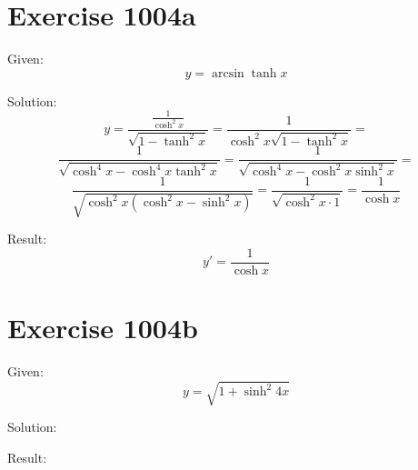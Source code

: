 \documentclass[a4paper, 10pt]{scrartcl}
\begin{document}
\section{Exercise 1004a}

Given:
\[
y = \arcsin{\tanh{x}}
\]

Solution:
\[
y = \frac{\frac{1}{\cosh^{2}{x}}}{\sqrt{1 - \tanh^{2}{x}}} = \frac{1}{\cosh^{2}{x}\sqrt{1 - \tanh^{2}{x}}} =
\]
\[
\frac{1}{\sqrt{\cosh^{4}{x} - \cosh^{4}{x}\tanh^{2}{x}}} = \frac{1}{\sqrt{\cosh^{4}{x} - \cosh^{2}{x}\sinh^{2}{x}}} =
\]
\[
\frac{1}{\sqrt{\cosh^{2}{x}(\cosh^{2}{x} - \sinh^{2}{x})}} = \frac{1}{\sqrt{\cosh^{2}{x}\cdot 1}} = \frac{1}{\cosh{x}}
\]

Result:
\[
y' = \frac{1}{\cosh{x}}
\]

\section{Exercise 1004b}

Given:
\[
y = \sqrt{1 + \sinh^{2}{4x}}
\]

Solution:

Result:
\end{document}
